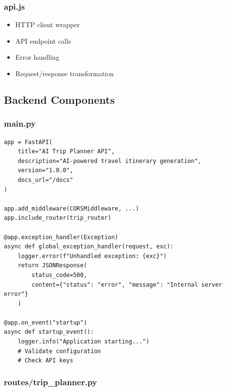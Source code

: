 \documentclass[12pt,a4paper]{report}
\begin{document}
\subsubsection{api.js}
\begin{itemize}
    \item HTTP client wrapper
    \item API endpoint calls
    \item Error handling
    \item Request/response transformation
\end{itemize}

\subsection{Backend Components}

\subsubsection{main.py}

\begin{lstlisting}[style=pythonstyle, caption={FastAPI Application Initialization}]
app = FastAPI(
    title="AI Trip Planner API",
    description="AI-powered travel itinerary generation",
    version="1.0.0",
    docs_url="/docs"
)

app.add_middleware(CORSMiddleware, ...)
app.include_router(trip_router)

@app.exception_handler(Exception)
async def global_exception_handler(request, exc):
    logger.error(f"Unhandled exception: {exc}")
    return JSONResponse(
        status_code=500,
        content={"status": "error", "message": "Internal server error"}
    )

@app.on_event("startup")
async def startup_event():
    logger.info("Application starting...")
    # Validate configuration
    # Check API keys
\end{lstlisting}

\subsubsection{routes/trip\_planner.py}
\end{document}
